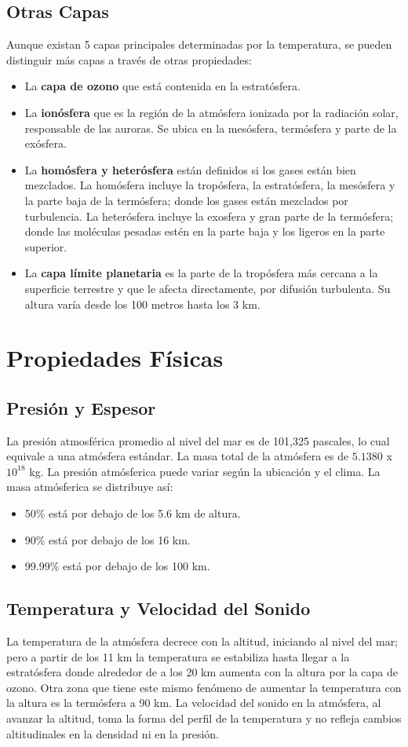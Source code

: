 \documentclass{article}
\begin{document}
\subsection{Otras Capas}
Aunque existan 5 capas principales determinadas por la temperatura, se pueden distinguir más capas a través de otras propiedades:
\begin{itemize}
\item La \textbf{capa de ozono} que está contenida en la estratósfera. 
\item La \textbf{ionósfera} que es la región de la atmósfera ionizada por la radiación solar, responsable de las auroras. Se ubica en la mesósfera, termósfera y parte de la exósfera.
\item La \textbf{homósfera y heterósfera} están definidos si los gases están bien mezclados. La homósfera incluye la tropósfera, la estratósfera, la mesósfera y la parte baja de la termósfera; donde los gases están mezclados por turbulencia. La heterósfera incluye la exosfera y gran parte de la termósfera; donde las moléculas pesadas estén en la parte baja y los ligeros en la parte superior.
\item La \textbf{capa límite planetaria} es la parte de la tropósfera más cercana a la superficie terrestre y que le afecta directamente, por difusión turbulenta. Su altura varía desde los 100 metros hasta los 3 km.
\end{itemize}
\section{Propiedades Físicas}
\subsection{Presión y Espesor}
La presión atmosférica promedio al nivel del mar es de 101,325 pascales, lo cual equivale a una atmósfera estándar. La masa total de la atmósfera es de $5.1380$ x $10^{18}$ kg. La presión atmósferica puede variar según la ubicación y el clima. La masa atmósferica se distribuye así:
\begin{itemize}
\item 50\% está por debajo de los 5.6 km de altura.
\item 90\% está por debajo de los 16 km.
\item 99.99\% está por debajo de los 100 km.
\end{itemize}

\subsection{Temperatura y Velocidad del Sonido}
La temperatura de la atmósfera decrece con la altitud, iniciando al nivel del mar; pero a partir de los 11 km la temperatura se estabiliza hasta llegar a la estratósfera donde alrededor de a los 20 km aumenta con la altura por la capa de ozono. Otra zona que tiene este mismo fenómeno de aumentar la temperatura con la altura es la termósfera a 90 km. 
La velocidad del sonido en la atmósfera, al avanzar la altitud, toma la forma del perfil de la temperatura y no refleja cambios altitudinales en la densidad ni en la presión.
\end{document}
